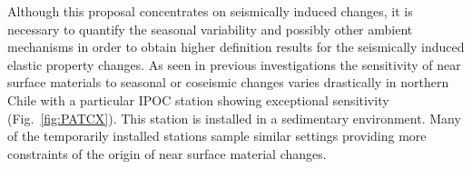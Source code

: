 \documentclass[11pt]{article}
\newcommand{\noteft}[1]{{\it \color{magenta} FT:#1}}
\newcommand{\noteft}[1]{}
\begin{document}
Although this proposal concentrates on seismically induced changes, it is necessary to quantify the seasonal variability and possibly other ambient mechanisms in order to obtain higher definition results for the seismically induced elastic property changes. As seen in previous investigations \citep{Richter2014} the sensitivity of near surface materials to seasonal or coseismic changes varies drastically in northern Chile with a particular IPOC station showing exceptional sensitivity (Fig.~\ref{fig:PATCX}). This station is installed in a sedimentary environment. Many of the temporarily installed stations %
sample similar settings providing more constraints of the origin of near surface material changes. 

\end{document}
